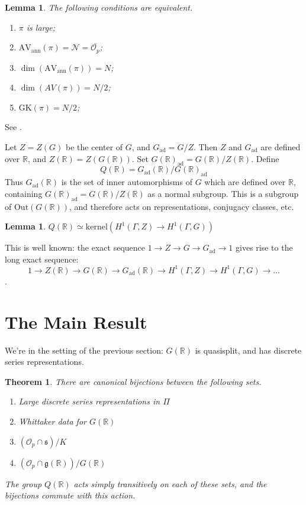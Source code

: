 \documentclass[10pt,leqno]{article}
\newtheorem{theorem}[equation]{Theorem}
\newtheorem{lemma}[equation]{Lemma}
\newcommand{\Out}{\mathrm{Out}}
\newcommand{\kernel}{\mathrm{kernel}}
\newcommand{\Gad}{G_\mathrm{ad}}
\renewcommand{\O}{\mathcal O}
\newcommand{\R}{\mathbb R}
\newcommand{\N}{\mathcal N}
\newcommand{\g}{\mathfrak g}
\newcommand{\s}{\mathfrak s}
\newcommand{\AVann}{\mathrm{AV}_{\mathrm{ann}}}
\newcommand{\GK}{\mathrm{GK}}
\newcommand{\Op}{\O_p}
\begin{document}
\begin{lemma}
  \label{l:large}
  The following conditions are equivalent.
  \begin{enumerate}
    \item $\pi$ is large;
\item $\AVann(\pi)=\N=\overline{\Op}$;
\item $\dim(\AVann(\pi))=N$;
  \item $\dim(AV(\pi))=N/2$;
\item $\GK(\pi)=N/2$;

\end{enumerate}
\end{lemma}
See \cite{vogan_bowdoin}.


Let $Z=Z(G)$ be the center of $G$, and $\Gad=G/Z$.
Then $Z$ and $\Gad$ are defined over $\R$, and $Z(\R)=Z(G(\R))$.
Set $G(\R)_{\mathrm{ad}}=G(\R)/Z(\R)$.
Define
$$
Q(\R)=\Gad(\R)/G(\R)_{\mathrm{ad}}
$$
Thus $\Gad(\R)$ is the set of inner automorphisms of $G$ which are defined over $\R$, containing
$G(\R)_{\mathrm{ad}}=G(\R)/Z(\R)$ as a normal subgroup. This is a subgroup of $\Out(G(\R))$,
and therefore acts on representations, conjugacy classes, etc.


\begin{lemma}
  \label{l:Q}
  $Q(\R)\simeq\kernel(H^1(\Gamma,Z)\rightarrow H^1(\Gamma,G))$
\end{lemma}

This is well known:
the exact sequence $1\rightarrow Z \rightarrow G \rightarrow \Gad\rightarrow 1$
gives rise to the long exact sequence:
$$
1\rightarrow Z(\R) \rightarrow G(\R) \rightarrow \Gad(\R) \rightarrow H^1(\Gamma,Z)\rightarrow H^1(\Gamma,G)\rightarrow\dots
$$.
\section{The Main Result}

We're in the setting of the previous section:  $G(\R)$ is quasisplit, and has discrete series representations.

\begin{theorem}
  \label{t:main}
There are canonical bijections between the following sets.

\begin{enumerate}
\item Large discrete series representations in $\Pi$
\item Whittaker data for $G(\R)$
\item $(\Op\cap \s)/K$
\item  $(\Op\cap \g(\R))/G(\R)$
\end{enumerate}

The group $Q(\R)$ acts simply transitively on each of these sets, and the bijections commute with this action.
\end{theorem}
\end{document}
